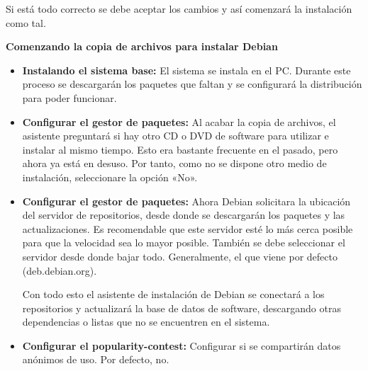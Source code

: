 				Si está todo correcto se debe aceptar los cambios y así comenzará la instalación como tal.\par
								
				\vspace{0.2cm}	
		
				\textbf{Comenzando la copia de archivos para instalar Debian}\par\vspace{0.2cm}
		
				\begin{itemize}
					
					\item \textbf{Instalando el sistema base:} El sistema se instala en el PC. Durante este proceso se descargarán los paquetes que faltan y se configurará la distribución para poder funcionar.\par
					
					\item \textbf{Configurar el gestor de paquetes:} Al acabar la copia de archivos, el asistente preguntará si hay otro CD o DVD de software para utilizar e instalar al mismo tiempo. Esto era bastante frecuente en el pasado, pero ahora ya está en desuso. Por tanto, como no se dispone otro medio de instalación, seleccionare la opción «No».\par 
					
					\item \textbf{Configurar el gestor de paquetes:} Ahora Debian solicitara la ubicación del servidor de repositorios, desde donde se descargarán los paquetes y las actualizaciones. Es recomendable que este servidor esté lo más cerca posible para que la velocidad sea lo mayor posible. También se debe seleccionar el servidor desde donde bajar todo. Generalmente, el que viene por defecto (deb.debian.org).\par
					
					Con todo esto el asistente de instalación de Debian se conectará a los repositorios y actualizará la base de datos de software, descargando otras dependencias o listas que no se encuentren en el sistema.\par
					
					\item \textbf{Configurar el popularity-contest:} Configurar si se compartirán datos anónimos de uso. Por defecto, no.\par	
					
				\end{itemize}
				
				\clearpage
				
